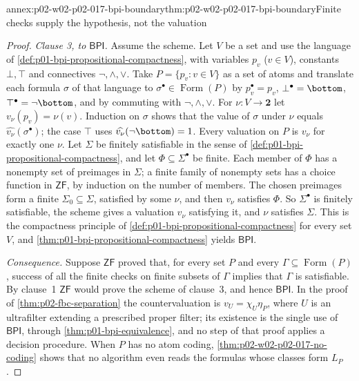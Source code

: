 \begin{annexitem}{annex:p02-w02-p02-017-bpi-boundary}{thm:p02-w02-p02-017-bpi-boundary}{Finite checks supply the hypothesis, not the valuation}
\begin{proof}
\emph{Clause 3, to \(\mathsf{BPI}\).}  Assume the scheme.  Let \(V\) be a
set and use the language of \cref{def:p01-bpi-propositional-compactness},
with variables \(p_v\) (\(v\in V\)), constants \(\bot,\top\) and
connectives \(\neg,\land,\lor\).  Take \(P=\{p_v:v\in V\}\) as a set of
atoms and translate each formula \(\sigma\) of that language to
\(\sigma^{\bullet}\in\operatorname{Form}(P)\) by
\(p_v^{\bullet}=p_v\), \(\bot^{\bullet}=\bottom\),
\(\top^{\bullet}=\neg\bottom\), and by commuting with
\(\neg,\land,\lor\).  For \(\nu:V\to\mathbf2\) let
\(v_\nu(p_v)=\nu(v)\).  Induction on \(\sigma\) shows that the value of
\(\sigma\) under \(\nu\) equals \(\widehat{v_\nu}(\sigma^{\bullet})\); the
case \(\top\) uses \(\widehat{v_\nu}(\neg\bottom)=1\).  Every valuation
on \(P\) is \(v_\nu\) for exactly one \(\nu\).  Let \(\Sigma\) be finitely
satisfiable in the sense of \cref{def:p01-bpi-propositional-compactness},
and let \(\Phi\subseteq\Sigma^{\bullet}\) be finite.  Each member of
\(\Phi\) has a nonempty set of preimages in \(\Sigma\); a finite family of
nonempty sets has a choice function in \(\mathsf{ZF}\), by induction on
the number of members.  The chosen preimages form a finite
\(\Sigma_0\subseteq\Sigma\), satisfied by some \(\nu\), and then
\(v_\nu\) satisfies \(\Phi\).  So \(\Sigma^{\bullet}\) is finitely
satisfiable, the scheme gives a valuation \(v_\nu\) satisfying it, and
\(\nu\) satisfies \(\Sigma\).  This is the compactness principle of
\cref{def:p01-bpi-propositional-compactness} for every set \(V\), and
\cref{thm:p01-bpi-propositional-compactness} yields \(\mathsf{BPI}\).

\emph{Consequence.}  Suppose \(\mathsf{ZF}\) proved that, for every set
\(P\) and every \(\Gamma\subseteq\operatorname{Form}(P)\), success of all
the finite checks on finite subsets of \(\Gamma\) implies that
\(\Gamma\) is satisfiable.  By clause~1 \(\mathsf{ZF}\) would prove the
scheme of clause~3, and hence \(\mathsf{BPI}\).  In the proof of
\cref{thm:p02-fbc-separation} the countervaluation is
\(v_U=\chi_U\eta_P\), where \(U\) is an ultrafilter extending a
prescribed proper filter; its existence is the single use of
\(\mathsf{BPI}\), through \cref{thm:p01-bpi-equivalence}, and no step of
that proof applies a decision procedure.  When \(P\) has no atom coding,
\cref{thm:p02-w02-p02-017-no-coding} shows that no algorithm even reads
the formulas whose classes form \(L_P\).
\end{proof}
\end{annexitem}


